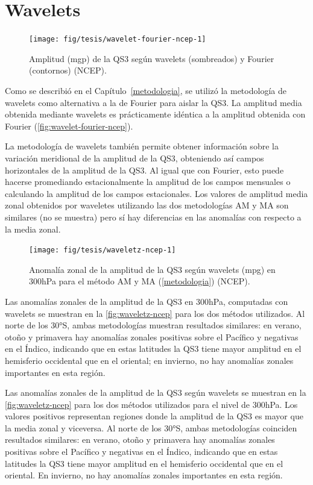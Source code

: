 \documentclass[spanish,a4paper,12pt,oneside]{book}
\begin{document}
\section*{Wavelets}

\begin{figure}
\texttt{[image: fig/tesis/wavelet-fourier-ncep-1]} \caption{Amplitud (mgp) de la QS3 según wavelets (sombreados) y Fourier (contornos) (NCEP).}\label{fig:wavelet-fourier-ncep}
\end{figure}

Como se describió en el Capítulo~\ref{metodologia}, se utilizó la
metodología de wavelets como alternativa a la de Fourier para aislar la
QS3. La amplitud media obtenida mediante wavelets es prácticamente
idéntica a la amplitud obtenida con Fourier
(\autoref{fig:wavelet-fourier-ncep}).

La metodología de wavelets también permite obtener información sobre la
variación meridional de la amplitud de la QS3, obteniendo así campos
horizontales de la amplitud de la QS3. Al igual que con Fourier, esto
puede hacerse promediando estacionalmente la amplitud de los campos
mensuales o calculando la amplitud de los campos estacionales. Los
valores de amplitud media zonal obtenidos por waveletes utilizando las
dos metodologías AM y MA son similares (no se muestra) pero sí hay
diferencias en las anomalías con respecto a la media zonal.

\begin{figure}

{\centering \texttt{[image: fig/tesis/waveletz-ncep-1]} 

}

\caption{Anomalía zonal de la amplitud de la QS3 según wavelets (mpg) en 300hPa para el método AM y MA (\autoref{metodologia}) (NCEP).}\label{fig:waveletz-ncep}
\end{figure}

Las anomalías zonales de la amplitud de la QS3 en 300hPa, computadas con
wavelets se muestran en la \autoref{fig:waveletz-ncep} para los dos
métodos utilizados. Al norte de los 30°S, ambas metodologías muestran
resultados similares: en verano, otoño y primavera hay anomalías zonales
positivas sobre el Pacífico y negativas en el Índico, indicando que en
estas latitudes la QS3 tiene mayor amplitud en el hemisferio occidental
que en el oriental; en invierno, no hay anomalías zonales importantes en
esta región.

Las anomalías zonales de la amplitud de la QS3 según wavelets se
muestran en la \autoref{fig:waveletz-ncep} para los dos métodos
utilizados para el nivel de 300hPa. Los valores positivos representan
regiones donde la amplitud de la QS3 es mayor que la media zonal y
viceversa. Al norte de los 30°S, ambas metodologías coinciden resultados
similares: en verano, otoño y primavera hay anomalías zonales positivas
sobre el Pacífico y negativas en el Índico, indicando que en estas
latitudes la QS3 tiene mayor amplitud en el hemisferio occidental que en
el oriental. En invierno, no hay anomalías zonales importantes en esta
región.
\end{document}
